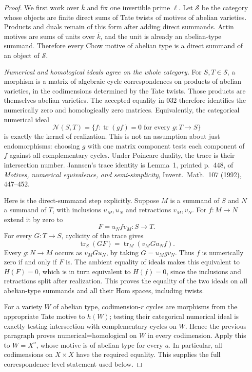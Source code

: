 \begin{proof}
We first work over $\bar k$ and fix one invertible prime $\ell$.
Let $\mathcal S$ be the category whose objects are finite direct
sums of Tate twists of motives of abelian varieties. Products and
duals remain of this form after adding direct summands. Artin
motives are sums of units over $\bar k$, and the unit is already
an abelian-type summand. Therefore every Chow motive of abelian
type is a direct summand of an object of $\mathcal S$.

\emph{Numerical and homological ideals agree on the whole category.}
For $S,T\in\mathcal S$, a morphism is a matrix of algebraic
cycle correspondences on products of abelian varieties, in the
codimensions determined by the Tate twists. Those products are
themselves abelian varieties. The accepted equality in 032
therefore identifies the numerically zero and homologically zero
matrices. Equivalently, the categorical numerical ideal
\[
 \mathcal N(S,T)
  =\{f:\operatorname{tr}(gf)=0\text{ for every }g:T\to S\}
                                                               \tag{JAC.P16.2}
\]
is exactly the kernel of realization. This is not an assumption
about just endomorphisms: choosing $g$ with one matrix component
tests each component of $f$ against all complementary cycles.
Under Poincare duality, the trace is their intersection number.
Jannsen's trace identity is Lemma~1, printed p.~448, of
\emph{Motives, numerical equivalence, and semi-simplicity},
Invent.\ Math.\ 107 (1992), 447--452.

Here is the direct-summand step explicitly. Suppose $M$ is a
summand of $S$ and $N$ a summand of $T$, with inclusions $u_M,u_N$
and retractions $v_M,v_N$. For $f:M\to N$ extend it by zero to
\[
                 F=u_N f v_M:S\longrightarrow T.
\]
For every $G:T\to S$, cyclicity of the trace gives
\[
 \operatorname{tr}_S(GF)
     =\operatorname{tr}_M(v_MG u_N f).                    \tag{JAC.P16.3}
\]
Every $g:N\to M$ occurs as $v_MG u_N$, by taking
$G=u_Mg v_N$. Thus $f$ is numerically zero if and only if $F$ is.
The ambient equality of ideals makes this equivalent to $H(F)=0$,
which is in turn equivalent to $H(f)=0$, since the inclusions and
retractions split after realization. This proves the equality of
the two ideals on all abelian-type summands and all their Hom
spaces, including twists.

For a variety $W$ of abelian type, codimension-$r$ cycles are
morphisms from the appropriate Tate motive to $h(W)$; testing
their categorical numerical ideal is exactly testing intersection
with complementary cycles on $W$. Hence the previous paragraph
proves numerical=homological on $W$ in every codimension.
Apply this to $W=X^a$, whose motive is of abelian type for every
$a$. In particular, all codimensions on $X\times X$ have the
required equality. This supplies the full correspondence-level
statement used below.


\end{proof}
